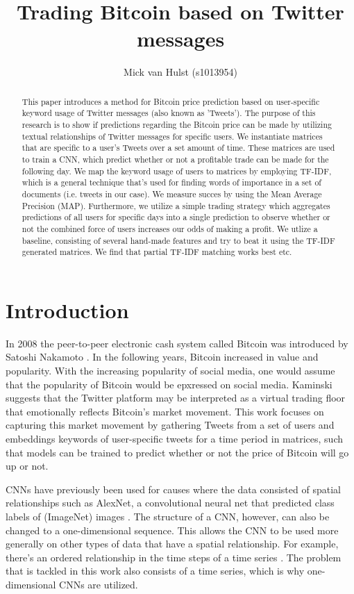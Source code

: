 \documentclass{article}
\title{Trading Bitcoin based on Twitter messages}
\author{Mick van Hulst (s1013954)}
\begin{document}
\maketitle

\begin{abstract}
This paper introduces a method for Bitcoin price prediction based on user-specific keyword usage of Twitter messages (also known as 'Tweets'). The purpose of this research is to show if predictions regarding the Bitcoin price can be made by utilizing textual relationships of Twitter messages for specific users. We instantiate matrices that are specific to a user's Tweets over a set amount of time. These matrices are used to train a CNN, which predict whether or not a profitable trade can be made for the following day. We map the keyword usage of users to matrices by employing TF-IDF, which is a general technique that's used for finding words of importance in a set of documents (i.e. tweets in our case). We measure succes by using the Mean Average Precision (MAP). Furthermore, we utilize a simple trading strategy which aggregates predictions of all users for specific days into a single prediction to observe whether or not the combined force of users increases our odds of making a profit. We utlize a baseline, consisting of several hand-made features and try to beat it using the TF-IDF generated matrices. We find that partial TF-IDF matching works best etc.
\end{abstract}

\section{Introduction}
In 2008 the peer-to-peer electronic cash system called Bitcoin was introduced by Satoshi Nakamoto \cite{Nakamoto_bitcoin:a}. In the following years, Bitcoin increased in value and popularity. With the increasing popularity of social media, one would assume that the popularity of Bitcoin would be epxressed on social media. Kaminski \cite{1406.7577} suggests that the Twitter platform may be interpreted as a virtual trading floor that emotionally reflects Bitcoin's market movement. This work focuses on capturing this market movement by gathering Tweets from a set of users and embeddings keywords of user-specific tweets for a time period in matrices, such that models can be trained to predict whether or not the price of Bitcoin will go up or not.

CNNs have previously been used for causes where the data consisted of spatial relationships such as AlexNet, a convolutional neural net that predicted class labels of (ImageNet) images \cite{NIPS2012_4824}. The structure of a CNN, however, can also be changed to a one-dimensional sequence. This allows the CNN to be used more generally on other types of data that have a spatial relationship. For example, there's an ordered relationship in the time steps of a time series \cite{machine_learning_mastery_2018}. The problem that is tackled in this work also consists of a time series, which is why one-dimensional CNNs are utilized.
\end{document}
